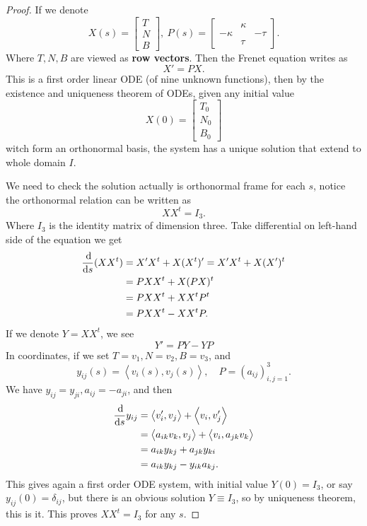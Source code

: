 \begin{proof}
    If we denote \[
        X(s)=\begin{bmatrix}
            T \\ N \\ B
        \end{bmatrix},\ 
        P(s)=\begin{bmatrix}
            & \kappa & \\
            -\kappa & & -\tau \\
            & \tau & 
        \end{bmatrix}
    .\] Where \(T,N,B\) are viewed as \textbf{row vectors}. Then the Frenet equation
    writes as \[
        X'=PX
    .\] This is a first order linear ODE (of nine unknown functions), then by the
    existence and uniqueness theorem of ODEs, given any initial value \[
        X(0)=\begin{bmatrix}
            T_0 \\ N_0 \\ B_0
        \end{bmatrix}
    \] witch form an orthonormal basis, the system has a unique solution that extend
    to whole domain \(I\).

    We need to check the solution actually is orthonormal frame for each \(s\),
    notice the orthonormal relation can be written as \[
        XX^t=I_3
    .\] Where \(I_3\) is the identity matrix of dimension three. Take differential
    on left-hand side of the equation we get
    \begin{align*}
        \frac{\dif}{\dif s}(XX^t)&= X'X^t+X(X^t)'=X'X^t+X(X')^t \\
        &= PXX^t+X(PX)^t \\
        &= PXX^t+XX^t P^t \\
        &= PXX^t-XX^t P
    .\end{align*}
    If we denote \(Y=XX^t\), we see \[
        Y'=PY-YP
    \] In coordinates, if we set \(T=v_1,N=v_2,B=v_3\), and \[
        y_{ij}(s)=\left<v_i(s),v_j(s)\right> ,\quad
        P=(a_{ij})_{i,j=1}^3
    .\] We have \(y_{ij}=y_{ji}, a_{ij}=-a_{ji}\), and then
    \begin{align*}
        \frac{\dif}{\dif s}y_{ij}&= \left<v_i',v_j\right> +\left<v_i,v_j'\right> \\
        &= \left<a_{ik}v_k,v_j\right> +\left<v_i,a_{jk}v_k\right> \\
        &= a_{ik}y_{kj}+a_{jk}y_{ki} \\
        &= a_{ik}y_{kj}-y_{ik}a_{kj}
    .\end{align*}
    This gives again a first order ODE system, with initial value \(Y(0)=I_3\), or
    say \(y_{ij}(0)=\delta_{ij}\), but there is an obvious solution \(Y\equiv I_3\),
    so by uniqueness theorem, this is it. This proves \(XX^t=I_3\) for any \(s\).


\end{proof}
